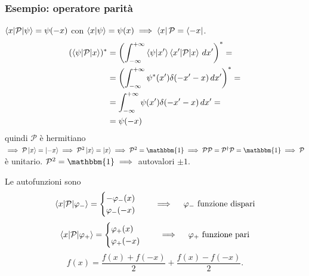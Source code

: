 \subsubsection{Esempio: operatore parità}
\( \braket{x|\mathcal{P}|\psi} = \psi(-x) \) con \( \braket{x|\psi} = \psi(x) \implies \bra{x} \mathcal{P} = \bra{-x} \).
\begin{align*}
(\braket{\psi|\mathcal{P}|x})^* &= \left( \int_{-\infty}^{+\infty} \braket{\psi|x'} \braket{x'|\mathcal{P}|x} \, dx' \right)^* = \\
&= \left( \int_{-\infty}^{+\infty} \psi^*(x') \delta(-x' - x) \, dx' \right)^* = \\
&= \int_{-\infty}^{+\infty} \psi(x') \delta(-x' - x) \, dx' = \\
&= \psi(-x)
\end{align*}
quindi \( \mathcal{P} \) è hermitiano \( \implies \mathcal{P} \ket{x} = \ket{-x} \implies \mathcal{P}^2 \ket{x} = \ket{x} \implies \mathcal{P}^2 = \mathbbm{1} \implies \mathcal{P} \mathcal{P} = \mathcal{P}^\dag \mathcal{P} = \mathbbm{1} \implies \mathcal{P} \) è unitario. \( \mathcal{P}^2 = \mathbbm{1} \implies \) autovalori \( \pm 1 \).


\bigskip
\noindent
Le autofunzioni sono
\[
\braket{x|\mathcal{P}|\varphi_{-}} = \begin{cases}
- \varphi_{-}(x) \\
\varphi_{-}(-x)
\end{cases} \quad \implies \quad \varphi_{-} \text{ funzione dispari}
\]
\[
\braket{x|\mathcal{P}|\varphi_{+}} = \begin{cases}
\varphi_{+}(x) \\
\varphi_{+}(-x)
\end{cases} \quad \implies \quad \varphi_{+} \text{ funzione pari}
\]
\[
f(x) = \frac{f(x) + f(-x)}{2} + \frac{f(x) - f(-x)}{2}.
\]